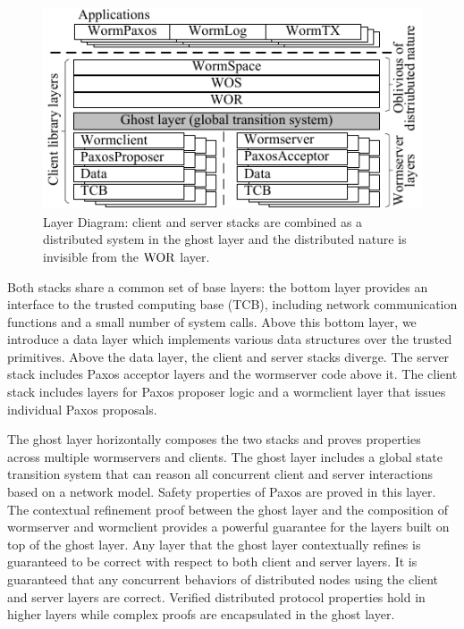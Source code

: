\begin{figure}
\centering
\includegraphics{figs/multipaxos/layer_diagram.pdf}
\caption{Layer Diagram: client and server stacks are combined as a distributed system in the ghost layer and the distributed nature is invisible from the $\mathrm{WOR}$ layer.
}
\label{fig:layerdiagram}
\end{figure}


Both stacks share a common set of base layers: the bottom layer provides an interface to the trusted computing base (TCB), including network communication functions and a small number of system calls. Above this bottom layer, we introduce a data layer which implements various data structures over the trusted primitives. Above the data layer, the client and server stacks diverge. The server stack includes Paxos acceptor layers and the wormserver code above it. The client stack includes layers for Paxos proposer logic and a wormclient layer that issues individual Paxos proposals.

	The ghost layer horizontally composes the two stacks and proves properties across multiple wormservers and clients. The ghost layer
	includes a global state transition system
	that can reason all concurrent client and server interactions based on a network model. Safety properties of Paxos are proved in this layer.
The contextual refinement proof between the ghost layer and the composition of wormserver and wormclient provides a powerful guarantee for the layers built on top of the ghost layer. Any layer that the ghost layer contextually refines is guaranteed to be correct with respect to both client and server layers. It is guaranteed that any concurrent behaviors of distributed nodes using the client and server layers are correct. Verified distributed protocol properties hold in higher layers while complex proofs are encapsulated in the ghost layer.



